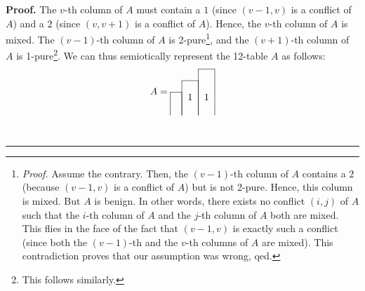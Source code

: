 \documentclass[numbers=enddot,12pt,final,onecolumn,notitlepage]{scrartcl}%
\theoremstyle{definition}
\newenvironment{proof}[1][Proof]{\noindent\textbf{#1.} }{\ \rule{0.5em}{0.5em}}
\newenvironment{vershort}{}{}
\begin{document}
\begin{vershort}
\begin{proof}
The $v$-th column of $A$ must contain a $1$ (since $\left(  v-1,v\right)  $ is
a conflict of $A$) and a $2$ (since $\left(  v,v+1\right)  $ is a conflict of
$A$). Hence, the $v$-th column of $A$ is mixed. The $\left(  v-1\right)  $-th
column of $A$ is 2-pure\footnote{\textit{Proof.} Assume the contrary. Then,
the $\left(  v-1\right)  $-th column of $A$ contains a $2$ (because $\left(
v-1,v\right)  $ is a conflict of $A$) but is not 2-pure. Hence, this column is
mixed. But $A$ is benign. In other words, there exists no conflict $\left(
i,j\right)  $ of $A$ such that the $i$-th column of $A$ and the $j$-th column
of $A$ both are mixed. This flies in the face of the fact that $\left(
v-1,v\right)  $ is exactly such a conflict (since both the $\left(
v-1\right)  $-th and the $v$-th columns of $A$ are mixed). This contradiction
proves that our assumption was wrong, qed.}, and the $\left(  v+1\right)  $-th
column of $A$ is 1-pure\footnote{This follows similarly.}. We can thus
semiotically represent the 12-table $A$ as follows:%
\begin{equation}
A=%
\begin{tabular}{ccc}
\cline{3-3} & & \multicolumn{1}{|c|}{} \\
\cline{2-2} & \multicolumn{1}{|c|}{} & \multicolumn{1}{|c|}{} \\
\cline{1-1} \multicolumn{1}{|c|}{} & \multicolumn{1}{|c|}{1} & \multicolumn
{1}{|c|}{1} \\
\multicolumn{1}{|c|}{} & \multicolumn{1}{|c|}{} & \multicolumn{1}{|c|}{} \\

\end{tabular}
\end{equation}
\end{proof}
\end{vershort}
\end{document}
